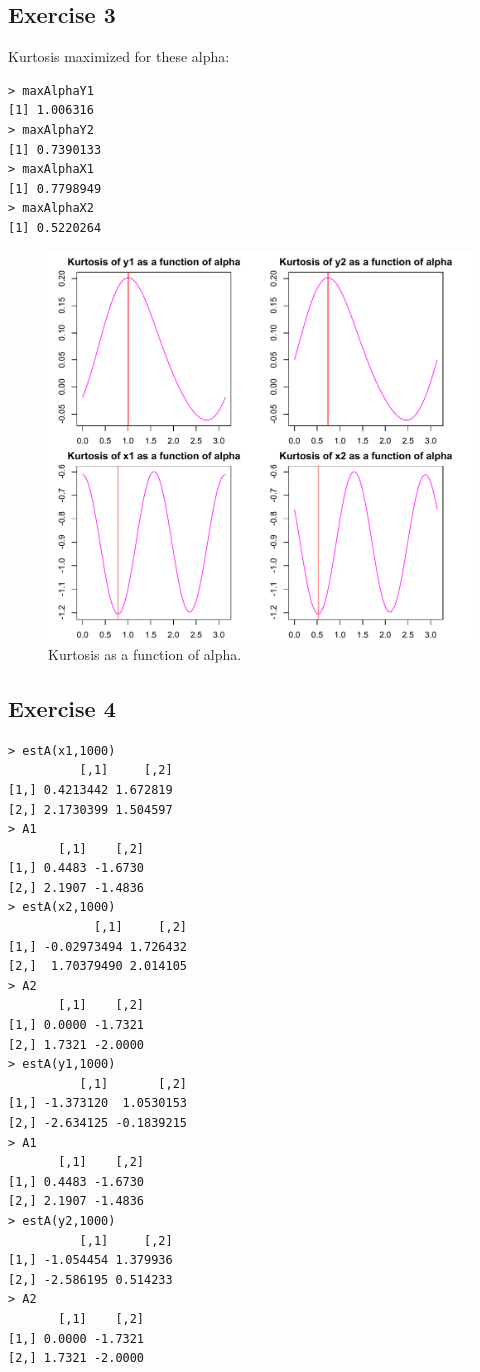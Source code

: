 \documentclass{article}
\begin{document}
\subsection{Exercise 3}
Kurtosis maximized for these alpha:
\begin{verbatim}
> maxAlphaY1
[1] 1.006316
> maxAlphaY2
[1] 0.7390133
> maxAlphaX1
[1] 0.7798949
> maxAlphaX2
[1] 0.5220264
\end{verbatim}
\begin{figure}\centering
	\includegraphics{kurtosisAlphaE23.pdf}
	\caption{Kurtosis as a function of alpha.} \label{fig:kurtosisAlphaE23}
\end{figure}
\subsection{Exercise 4}
\begin{verbatim}
> estA(x1,1000)
          [,1]     [,2]
[1,] 0.4213442 1.672819
[2,] 2.1730399 1.504597
> A1
       [,1]    [,2]
[1,] 0.4483 -1.6730
[2,] 2.1907 -1.4836
> estA(x2,1000)
            [,1]     [,2]
[1,] -0.02973494 1.726432
[2,]  1.70379490 2.014105
> A2
       [,1]    [,2]
[1,] 0.0000 -1.7321
[2,] 1.7321 -2.0000
> estA(y1,1000)
          [,1]       [,2]
[1,] -1.373120  1.0530153
[2,] -2.634125 -0.1839215
> A1
       [,1]    [,2]
[1,] 0.4483 -1.6730
[2,] 2.1907 -1.4836
> estA(y2,1000)
          [,1]     [,2]
[1,] -1.054454 1.379936
[2,] -2.586195 0.514233
> A2
       [,1]    [,2]
[1,] 0.0000 -1.7321
[2,] 1.7321 -2.0000
\end{verbatim}
\end{document}
